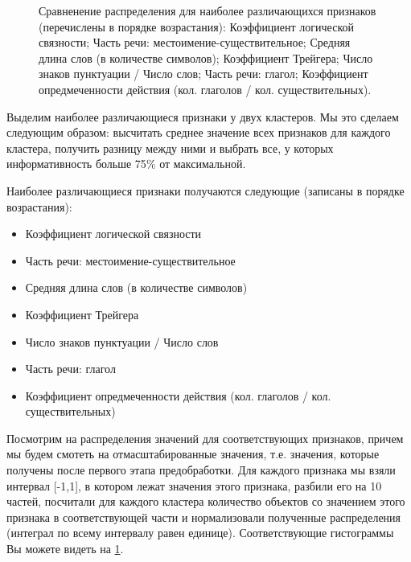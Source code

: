 \documentclass[12pt]{article}
\begin{document}
\begin{figure}[ht!]
 \centering {}  
\caption{Сравненение распределения для наиболее различающихся признаков (перечислены в порядке возрастания):   Коэффициент логической связности;   Часть речи: местоимение-существительное;  Средняя длина слов (в количестве символов);   Коэффициент Трейгера;   Число знаков пунктуации / Число слов;   Часть речи: глагол;   Коэффициент опредмеченности действия (кол. глаголов / кол. существительных).} \label{hist1}
\end{figure}

Выделим наиболее различающиеся признаки у двух кластеров. Мы это сделаем следующим образом: высчитать среднее значение всех признаков для каждого кластера, получить разницу между ними и выбрать все, у которых информативность больше 75$\%$ от максимальной.

Наиболее различающиеся признаки получаются следующие (записаны в порядке возрастания):

\begin{itemize}
\item  Коэффициент логической связности
\item  Часть речи: местоимение-существительное
\item  Средняя длина слов (в количестве символов)
\item  Коэффициент Трейгера
\item  Число знаков пунктуации / Число слов
\item  Часть речи: глагол
\item  Коэффициент опредмеченности действия (кол. глаголов / кол. существительных)
\end{itemize}


Посмотрим на распределения значений для соответствующих признаков, причем мы будем смотеть на отмасштабированные значения, т.е. значения, которые получены после первого этапа предобработки. Для каждого признака мы взяли интервал [-1,1], в котором лежат значения этого признака, разбили его на 10 частей, посчитали для каждого кластера количество объектов со значением этого признака в соответствующей части и нормализовали полученные распределения (интеграл по всему интервалу равен единице). Соответствующие гистограммы Вы можете видеть на \ref{hist1}.
\end{document}
